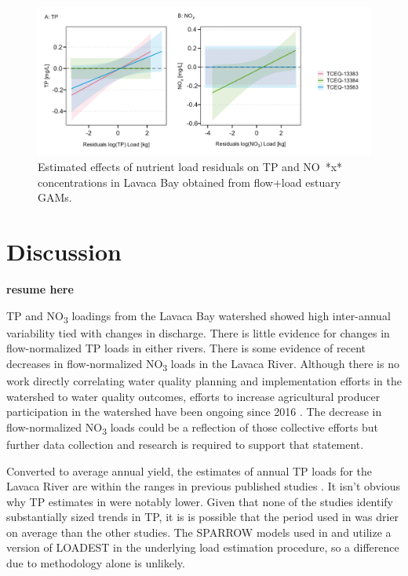 \documentclass[sn-basic,referee,lineno,pdflatex]{sn-jnl}
\begin{document}
\begin{figure}

{\centering \includegraphics[width=1\linewidth,]{Schramm-2023-05-AS_files/figure-latex/fig7-1} 

}

\caption{Estimated effects of nutrient load residuals on TP and NO~*x*~ concentrations in Lavaca Bay obtained from flow+load estuary GAMs.}\label{fig:fig7}
\end{figure}

\hypertarget{discussion}{%
\section{Discussion}\label{discussion}}

\textbf{resume here}

TP and NO\textsubscript{3} loadings from the Lavaca Bay watershed showed
high inter-annual variability tied with changes in discharge. There is
little evidence for changes in flow-normalized TP loads in either
rivers. There is some evidence of recent decreases in flow-normalized
NO\textsubscript{3} loads in the Lavaca River. Although there is no work
directly correlating water quality planning and implementation efforts
in the watershed to water quality outcomes, efforts to increase
agricultural producer participation in the watershed have been ongoing
since 2016
\citep{schrammLavacaRiverWatershed2018, bertholdDirectMailingEducation2021}.
The decrease in flow-normalized NO\textsubscript{3} loads could be a
reflection of those collective efforts but further data collection and
research is required to support that statement.

Converted to average annual yield, the estimates of annual TP loads for
the Lavaca River are within the ranges in previous published studies
\citep[Table~\ref{tab:table5},][]{dunnTrendsNutrientInflows1996, rebichSourcesDeliveryNutrients2011, omaniEstimationSedimentNutrient2014, wise_spatially_2019}.
It isn't obvious why TP estimates in
\citet{dunnTrendsNutrientInflows1996} were notably lower. Given that
none of the studies identify substantially sized trends in TP, it is is
possible that the period used in \citet{dunnTrendsNutrientInflows1996}
was drier on average than the other studies. The SPARROW models used in
\citet{rebichSourcesDeliveryNutrients2011} and
\citet{wise_spatially_2019} utilize a version of LOADEST in the
underlying load estimation procedure, so a difference due to methodology
alone is unlikely.
\end{document}
